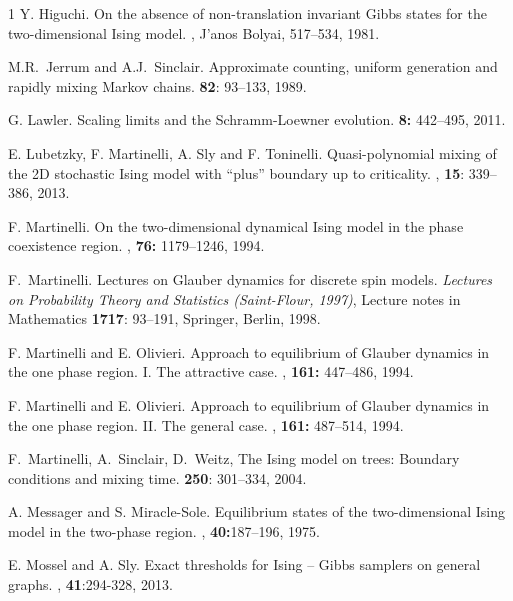\documentclass[letterpaper,english,numberwithinsect]{amsart}
\begin{document}
\begin{thebibliography}{1}
\label{hig}
Y. Higuchi.
\newblock On the absence of non-translation invariant Gibbs states for the two-dimensional Ising model.
, J'anos Bolyai, 517--534, 1981.

\label{js}
M.R.~Jerrum and A.J.~Sinclair.
\newblock Approximate counting, uniform generation and rapidly mixing Markov chains.
 {\bf 82}: 93--133, 1989.

\label{lawler}
G. Lawler.
\newblock Scaling limits and the Schramm-Loewner evolution.
 {\bf 8:} 442--495, 2011.

\label{lmst}
E. Lubetzky, F. Martinelli, A. Sly and F. Toninelli.
\newblock Quasi-polynomial mixing of the 2D stochastic Ising model with ``plus'' boundary up to criticality.
, {\bf 15}: 339--386, 2013.

\label{martinelli94}
F. Martinelli.
\newblock On the two-dimensional dynamical Ising model in the phase coexistence region.
, {\bf 76:} 1179–1246, 1994.


\label{mart}
F.~Martinelli.
\newblock Lectures on Glauber dynamics for discrete spin models.
\newblock \emph{Lectures on Probability Theory and Statistics (Saint-Flour, 
1997)}, Lecture notes in Mathematics {\bf 1717}: 93--191, Springer, 
Berlin, 1998.

\label{mo1}
F. Martinelli and E. Olivieri.
\newblock Approach to equilibrium of Glauber dynamics in the one phase region. I. The attractive case.
,  {\bf 161:} 447--486, 1994.

\label{mo2}
F. Martinelli and E. Olivieri.
\newblock Approach to equilibrium of Glauber dynamics in the one phase region. II. The general case.
, {\bf 161:} 487--514, 1994.

\label{msw1}
F.~Martinelli, A.~Sinclair, D.~Weitz,
\newblock The Ising model on trees: Boundary conditions and mixing time.
 {\bf 250}:  301--334, 2004.

\label{mms}
A. Messager and S. Miracle-Sole.
\newblock Equilibrium states of the two-dimensional Ising model in the two-phase region.
, {\bf 40:}187--196, 1975.

\label{mossly}
E. Mossel and A. Sly.
\newblock Exact thresholds for Ising -- Gibbs samplers on general graphs.
, {\bf 41}:294-328, 2013.


\end{thebibliography}
\end{document}
